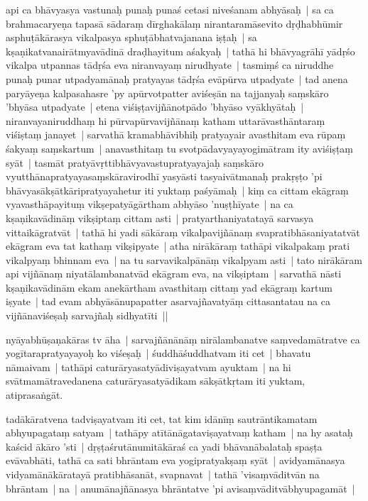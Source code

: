 \documentclass[article,12pt,a4paper]{memoir}%
\newcounter{parCount}
\begin{document}
	  
	  \pstart \leavevmode%
	\label{thakur75-15.9}api ca bhāvyasya vastunaḥ punaḥ punaś cetasi niveśanam abhyāsaḥ | sa ca brahmacaryeṇa tapasā sādaraṃ dīrghakālaṃ nirantaramāsevito dṛḍhabhūmir asphuṭākārasya vikalpasya sphuṭābhatvajanana iṣṭaḥ | sa kṣaṇikatvanairātmyavādinā draḍhayitum aśakyaḥ | tathā hi bhāvyagrāhī yādṛśo vikalpa utpannas tādṛśa eva niranvayaṃ nirudhyate | tasmiṃś ca niruddhe punaḥ punar utpadyamānaḥ pratyayas tādṛśa evāpūrva utpadyate | tad anena paryāyeṇa kalpasahasre 'py apūrvotpatter aviśeṣān na tajjanyaḥ saṃskāro 'bhyāsa utpadyate | etena viśiṣṭavijñānotpādo 'bhyāso vyākhyātaḥ | niranvayaniruddhaṃ hi pūrvapūrvavijñānaṃ katham uttarāvasthāntaraṃ viśiṣtaṃ janayet | sarvathā kramabhāvibhiḥ pratyayair avasthitam eva rūpaṃ śakyaṃ saṃskartum | anavasthitaṃ tu svotpādavyayayogimātram ity aviśiṣṭaṃ syāt | tasmāt pratyāvṛttibhāvyavastupratyayajaḥ saṃskāro vyutthānapratyayasaṃskāravirodhī yasyāsti tasyaivātmanaḥ prakṛṣṭo 'pi bhāvyasākṣātkāripratyayahetur iti yuktaṃ paśyāmaḥ | kiṃ ca cittam ekāgraṃ vyavasthāpayituṃ vikṣepatyāgārtham abhyāso 'nuṣṭhīyate | na ca kṣaṇikavādināṃ vikṣiptaṃ cittam asti | pratyarthaniyatatayā sarvasya vittaikāgratvāt | tathā hi yadi sākāraṃ vikalpavijñānaṃ svapratibhāsaniyatatvāt ekāgram eva tat kathaṃ vikṣipyate | atha nirākāraṃ tathāpi vikalpakaṃ prati vikalpyaṃ bhinnam eva | na tu sarvavikalpānāṃ vikalpyam asti | tato nirākāram api vijñānaṃ niyatālambanatvād ekāgram eva, na vikṣiptam | sarvathā nāsti kṣaṇikavādinām ekam anekārtham avasthitaṃ cittaṃ yad ekāgraṃ kartum iṣyate | tad evam abhyāsānupapatter asarvajñavatyāṃ cittasantatau na ca vijñānaviśeṣaḥ sarvajñaḥ sidhyatīti || 
	{}
	\pend%
      

	  
	  \pstart \leavevmode%
	\label{thakur75-15.30}nyāyabhūṣaṇakāras tv āha | sarvajñānānāṃ nirālambanatve saṃvedamātratve ca yogītarapratyayayoḥ ko viśeṣaḥ | śuddhāśuddhatvam iti cet | bhavatu nāmaivam | tathāpi caturāryasatyādiviṣayatvam ayuktam | na hi svātmamātravedanena caturāryasatyādikam sākṣātkṛtam iti yuktam, atiprasaṅgāt. 
	{}
	\pend%
      

	  
	  \pstart \leavevmode%
	\label{thakur75-16.1}tadākāratvena tadviṣayatvam iti cet, tat kim idānīṃ sautrāntikamatam abhyupagataṃ satyam | tathāpy atītānāgataviṣayatvaṃ katham | na hy asataḥ kaścid ākāro 'sti | dṛṣṭaśrutānumitākāraś ca yadi bhāvanābalataḥ spaṣṭa evāvabhāti, tathā ca sati bhrāntam eva yogipratyakṣaṃ syāt | avidyamānasya vidyamānākāratayā pratibhāsanāt, svapnavat | tathā 'visaṃvāditvān na bhrāntam | na | anumānajñānasya bhrāntatve 'pi avisaṃvāditvābhyupagamāt | 
	{}
	\pend%
      
\end{document}
